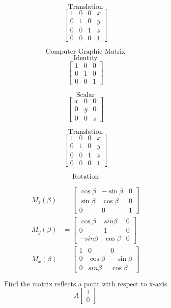 \documentclass[10pt]{article}
\begin{document}
\[ \text{Translation} \]
\[
        \begin{bmatrix}
            1 & 0 & 0 & x\\
            0 & 1 & 0 & y\\   
            0 & 0 & 1 & z\\  
            0 & 0 & 0 & 1  
        \end{bmatrix}
\]

\newpage
\[\text{Computer Graphic Matrix} \]
\[\text{Identity}\]
\[
        \begin{bmatrix}
            1 & 0 & 0\\
            0 & 1 & 0\\   
            0 & 0 & 1  
        \end{bmatrix}
\]

\[ \text{Scalar} \]
\[
        \begin{bmatrix}
            x & 0 & 0\\
            0 & y & 0\\   
            0 & 0 & z  
        \end{bmatrix}
\]

\[ \text{Translation} \]
\[
        \begin{bmatrix}
            1 & 0 & 0 & x\\
            0 & 1 & 0 & y\\   
            0 & 0 & 1 & z\\  
            0 & 0 & 0 & 1  
        \end{bmatrix}
\]

\[ \text{Rotation} \]

\begin{equation}
\begin{aligned}
    M_{z}(\beta) & =\begin{bmatrix}
            \cos\beta & -\sin\beta & 0\\
            \sin\beta & \cos\beta & 0\\   
            0      &   0    & 1  
        \end{bmatrix} \\
    M_{y}(\beta) & =\begin{bmatrix}
            \cos \beta & sin\beta & 0\\
            0      &   1    & 0    \\  
            -sin\beta & \cos\beta & 0   
        \end{bmatrix} \\
    M_{x}(\beta) & =\begin{bmatrix}
            1 &   0      &     0   \\         
            0 & \cos\beta & -\sin\beta\\
            0 & sin\beta& \cos\beta   
        \end{bmatrix} 
\end{aligned}
\end{equation}

\[ \text{Find the matrix reflects a point with respect to x-axis} \]
\[
        A \left[ 
        \begin{array}{c}
        1\\
        0    
        \end{array}
        \right]
\]
\end{document}
